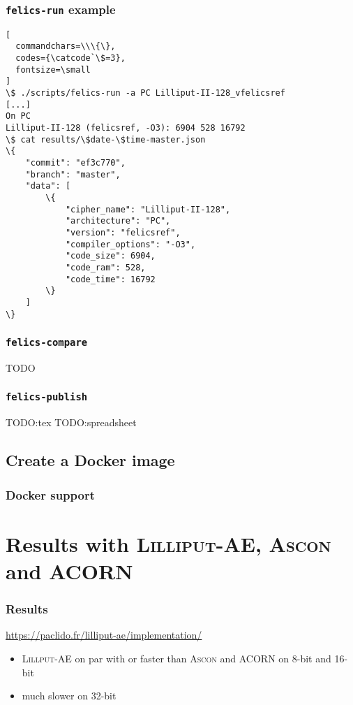 \documentclass[english]{beamer}
\begin{document}
\begin{frame}[fragile]
  \frametitle{\texttt{felics-run} example}

\begin{Verbatim}[
  commandchars=\\\{\},
  codes={\catcode`\$=3},
  fontsize=\small
]
\$ ./scripts/felics-run -a PC Lilliput-II-128_vfelicsref
[...]
On PC
Lilliput-II-128 (felicsref, -O3): 6904 528 16792
\$ cat results/\$date-\$time-master.json
\{
    "commit": "ef3c770",
    "branch": "master",
    "data": [
        \{
            "cipher_name": "Lilliput-II-128",
            "architecture": "PC",
            "version": "felicsref",
            "compiler_options": "-O3",
            "code_size": 6904,
            "code_ram": 528,
            "code_time": 16792
        \}
    ]
\}
\end{Verbatim}

\end{frame}

\begin{frame}
  \frametitle{\texttt{felics-compare}}
  TODO
\end{frame}

\begin{frame}
  \frametitle{\texttt{felics-publish}}
  TODO:tex
  TODO:spreadsheet
\end{frame}

\subsection{Create a Docker image}

\begin{frame}
  \frametitle{Docker support}
\end{frame}

\section[Results]{Results with \textsc{Lilliput-AE}, \textsc{Ascon} and ACORN}

\begin{frame}
  \frametitle{Results}

  \url{https://paclido.fr/lilliput-ae/implementation/}

  \begin{itemize}
  \item \textsc{Lillput-AE} on par with or faster than \textsc{Ascon} and ACORN on 8-bit and 16-bit
  \item much slower on 32-bit
  \end{itemize}

\end{frame}
\end{document}
